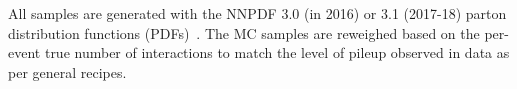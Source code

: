 All samples are generated with the NNPDF 3.0 (in 2016) or 3.1 (2017-18) parton distribution functions (PDFs)~\cite{NNPDF2015}.
The MC samples are reweighed based on the per-event true number of interactions to match the level of pileup observed in data as per general recipes.


